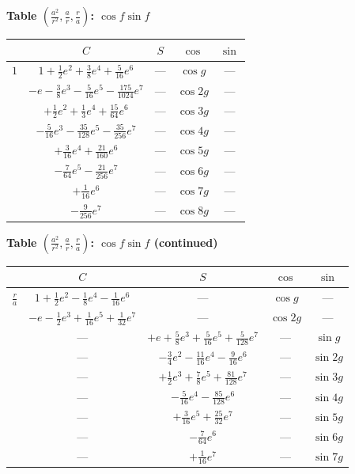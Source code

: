 \documentclass[11pt,a4paper]{book}
\begin{document}
{{\vspace{1em}

\noindent\textbf{Table $(\frac{a^2}{r^2}, \frac{a}{r}, \frac{r}{a})$: $\cos f \sin f$}

\vspace{0.5em}

\begin{center}
\begin{tabular}{|c|c|c|c|c|}
\hline
& $C$ & $S$ & $\cos$ & $\sin$ \\
\hline
$1$ & $1 + \frac{1}{2}e^2 + \frac{3}{8}e^4 + \frac{5}{16}e^6$ & --- & $\cos g$ & --- \\
& $-e - \frac{3}{8}e^3 - \frac{5}{16}e^5 - \frac{175}{1024}e^7$ & --- & $\cos 2g$ & --- \\
& $+ \frac{1}{2}e^2 + \frac{1}{3}e^4 + \frac{15}{64}e^6$ & --- & $\cos 3g$ & --- \\
& $- \frac{5}{16}e^3 - \frac{35}{128}e^5 - \frac{35}{256}e^7$ & --- & $\cos 4g$ & --- \\
& $+ \frac{3}{16}e^4 + \frac{21}{160}e^6$ & --- & $\cos 5g$ & --- \\
& $- \frac{7}{64}e^5 - \frac{21}{256}e^7$ & --- & $\cos 6g$ & --- \\
& $+ \frac{1}{16}e^6$ & --- & $\cos 7g$ & --- \\
& $- \frac{9}{256}e^7$ & --- & $\cos 8g$ & --- \\
\hline
\end{tabular}
\end{center}

\vspace{1em}

\noindent\textbf{Table $(\frac{a^2}{r^2}, \frac{a}{r}, \frac{r}{a})$: $\cos f \sin f$ (continued)}

\vspace{0.5em}

\begin{center}
\begin{tabular}{|c|c|c|c|c|}
\hline
& $C$ & $S$ & $\cos$ & $\sin$ \\
\hline
$\frac{r}{a}$ & $1 + \frac{1}{2}e^2 - \frac{1}{8}e^4 - \frac{1}{16}e^6$ & --- & $\cos g$ & --- \\
& $-e - \frac{1}{2}e^3 + \frac{1}{16}e^5 + \frac{1}{32}e^7$ & --- & $\cos 2g$ & --- \\
& --- & $+e + \frac{5}{8}e^3 + \frac{5}{16}e^5 + \frac{5}{128}e^7$ & --- & $\sin g$ \\
& --- & $- \frac{3}{4}e^2 - \frac{11}{16}e^4 - \frac{9}{16}e^6$ & --- & $\sin 2g$ \\
& --- & $+ \frac{1}{2}e^3 + \frac{7}{8}e^5 + \frac{81}{128}e^7$ & --- & $\sin 3g$ \\
& --- & $- \frac{5}{16}e^4 - \frac{85}{128}e^6$ & --- & $\sin 4g$ \\
& --- & $+ \frac{3}{16}e^5 + \frac{25}{32}e^7$ & --- & $\sin 5g$ \\
& --- & $- \frac{7}{64}e^6$ & --- & $\sin 6g$ \\
& --- & $+ \frac{1}{16}e^7$ & --- & $\sin 7g$ \\
\hline
\end{tabular}
\end{center}

}}
\end{document}
